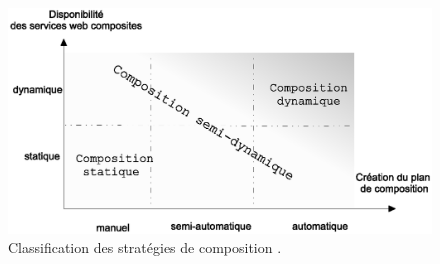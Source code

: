 \begin{figure}[h]
    \centering
    \includegraphics[width=1.1\textwidth]{figs/static-vs-dynamic-composition.eps}
    \caption{Classification des stratégies de composition
      \cite{fluegge2006challenges}.}
    \label{fig:static-vs-dynamic-composition}
\end{figure}
